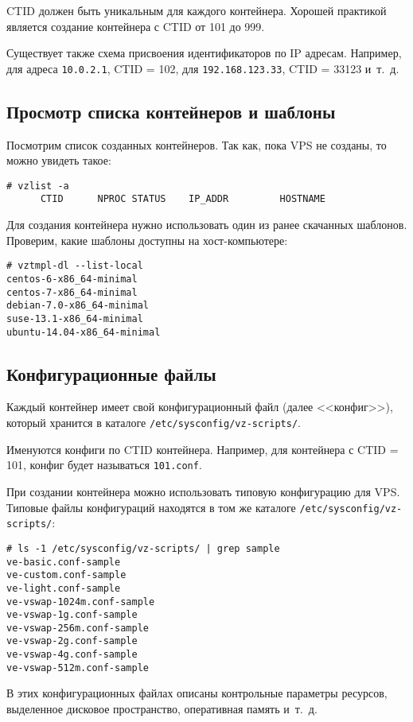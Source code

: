 CTID должен быть уникальным для каждого контейнера.
Хорошей практикой является создание контейнера с CTID от 101 до 999.

Существует также схема присвоения идентификаторов по IP адресам.
Например, для адреса \texttt{10.0.2.1}, CTID = 102, для \texttt{192.168.123.33}, CTID = 33123 и~т.~д. \cite{virtuozzolinux}

\subsection{Просмотр списка контейнеров и шаблоны}
Посмотрим список созданных контейнеров.
Так как, пока VPS не созданы, то можно увидеть такое:
\begin{lstlisting}
# vzlist -a
      CTID      NPROC STATUS    IP_ADDR         HOSTNAME 
\end{lstlisting}

Для создания контейнера нужно использовать один из ранее скачанных шаблонов.
Проверим, какие шаблоны доступны на хост-компьютере:
\begin{lstlisting}
# vztmpl-dl --list-local
centos-6-x86_64-minimal
centos-7-x86_64-minimal
debian-7.0-x86_64-minimal
suse-13.1-x86_64-minimal
ubuntu-14.04-x86_64-minimal
\end{lstlisting}

\subsection{Конфигурационные файлы}
Каждый контейнер имеет свой конфигурационный файл (далее <<конфиг>>), который хранится в каталоге \texttt{/etc/sysconfig/vz-scripts/}.

Именуются конфиги по CTID контейнера.
Например, для контейнера с CTID = 101, конфиг будет называться \texttt{101.conf}.

При создании контейнера можно использовать типовую конфигурацию для VPS.
Типовые файлы конфигураций находятся в том же каталоге \texttt{/etc/sysconfig/vz-scripts/}:
\begin{lstlisting}
# ls -1 /etc/sysconfig/vz-scripts/ | grep sample
ve-basic.conf-sample
ve-custom.conf-sample
ve-light.conf-sample
ve-vswap-1024m.conf-sample
ve-vswap-1g.conf-sample
ve-vswap-256m.conf-sample
ve-vswap-2g.conf-sample
ve-vswap-4g.conf-sample
ve-vswap-512m.conf-sample
\end{lstlisting}

В этих конфигурационных файлах описаны контрольные параметры ресурсов, выделенное дисковое пространство, оперативная память и~т.~д.

